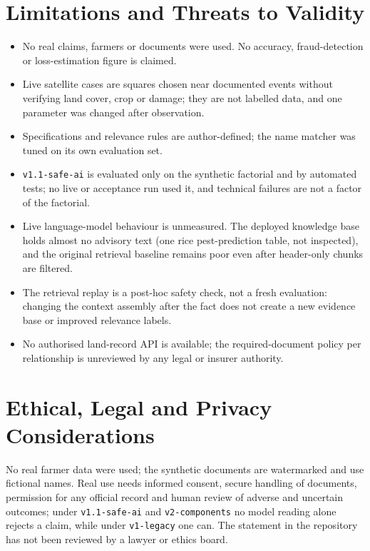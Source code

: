 \documentclass[journal]{IEEEtran}
\begin{document}
\section{Limitations and Threats to Validity}
\begin{itemize}
\item No real claims, farmers or documents were used. No accuracy, fraud-detection or loss-estimation figure is claimed.
\item Live satellite cases are \SatLiveSquares{} squares chosen near documented events without verifying land cover, crop or damage; they are not labelled data, and one parameter was changed after observation.
\item Specifications and relevance rules are author-defined; the name matcher was tuned on its own evaluation set.
\item \texttt{v1.1-safe-ai} is evaluated only on the synthetic factorial and by automated tests; no live or acceptance run used it, and technical failures are not a factor of the factorial.
\item Live language-model behaviour is unmeasured. The deployed knowledge base holds almost no advisory text (one rice pest-prediction table, not inspected), and the original retrieval baseline remains poor even after header-only chunks are filtered.
\item The retrieval replay is a post-hoc safety check, not a fresh evaluation: changing the context assembly after the fact does not create a new evidence base or improved relevance labels.
\item No authorised land-record API is available; the required-document policy per relationship is unreviewed by any legal or insurer authority.
\end{itemize}

\section{Ethical, Legal and Privacy Considerations}
No real farmer data were used; the synthetic documents are watermarked and use fictional names. Real use needs informed consent, secure handling of documents, permission for any official record and human review of adverse and uncertain outcomes; under \texttt{v1.1-safe-ai} and \texttt{v2-components} no model reading alone rejects a claim, while under \texttt{v1-legacy} one can. The statement in the repository has not been reviewed by a lawyer or ethics board.
\end{document}
